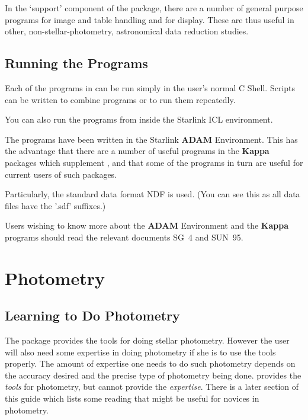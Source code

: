 In the `support' component of the \starman package, there are a number of
general purpose programs for image and table handling and for display.
These are thus useful in other, non-stellar-photometry, astronomical data
reduction studies.
 
\subsection{Running the Programs }
 
Each of the programs in \starman can be run simply in the user's
normal C Shell. Scripts can be written to combine programs or to
run them repeatedly.
 
You can also run the programs from inside the Starlink ICL environment.
 
The programs have been written in the Starlink {\bf ADAM} Environment. This
has the advantage that there are a number of useful programs in the {\bf
Kappa} packages which supplement \starman, and that some of the \starman
programs in turn are useful for current users of such packages.
 
Particularly, the standard data format NDF is used. (You can see
this as all data files have the '.sdf' suffixes.)
 
Users wishing to know more about the {\bf ADAM} Environment and the
{\bf Kappa} programs should read the relevant documents
SG~4 and SUN~95.
 
 
 
 
 
 
 
 
 
 
 
 
 
\section { Photometry}
 
 
\subsection{Learning to Do Photometry}
 
The \starman package provides the tools for doing stellar photometry.
However the user will also need some expertise in doing photometry if she is
to use the tools properly. The amount of expertise one needs to do such
photometry depends on the accuracy desired and the precise type of
photometry being done. \starman provides the {\it tools\/} for photometry,
but cannot provide the {\it expertise}. There is a later section of this
guide which lists some reading that might be useful for novices in
photometry.
 
